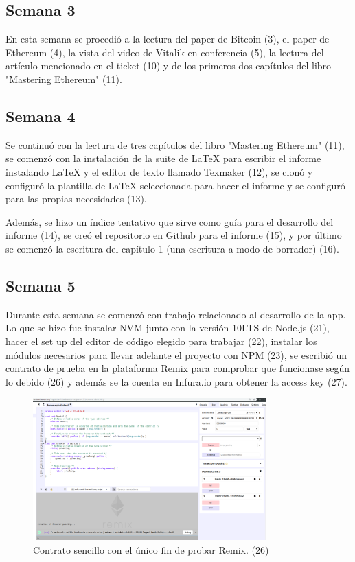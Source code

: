 \subsection{Semana 3}
En esta semana se procedió a la lectura del paper de Bitcoin (3), el paper de Ethereum (4),
 la vista del video de Vitalik en conferencia (5), la lectura del artículo mencionado en el 
 ticket (10) y de los primeros dos capítulos del libro "Mastering Ethereum" (11).
 
\subsection{Semana 4}
Se continuó con la lectura de tres capítulos del libro "Mastering Ethereum" (11), se comenzó 
con la instalación de la suite de LaTeX para escribir el informe instalando LaTeX y el editor 
de texto llamado Texmaker (12), se clonó y configuró la plantilla de LaTeX seleccionada para 
hacer el informe y se configuró para las propias necesidades (13).

Además, se hizo un índice tentativo que sirve como guía para el desarrollo del informe (14), 
se creó el repositorio en Github para el informe (15), y por último se comenzó la escritura del
capítulo 1 (una escritura a modo de borrador) (16).


\subsection{Semana 5}
Durante esta semana se comenzó con trabajo relacionado al desarrollo de la app. Lo que se hizo fue
instalar NVM junto con la versión 10LTS de Node.js (21), hacer el set up del editor de código elegido
para trabajar (22), instalar los módulos necesarios para llevar adelante el proyecto con NPM (23),
se escribió un contrato de prueba en la plataforma Remix para comprobar que funcionase según lo
debido (26) y además se la cuenta en Infura.io para obtener la access key (27).

\begin{figure}[htbp!] 
\centering    
\includegraphics[width=0.8\textwidth]{contract-test}
\caption[contracttest]{Contrato sencillo con el único fin de probar Remix. (26)}
\label{fig:contract-test}
\end{figure}

